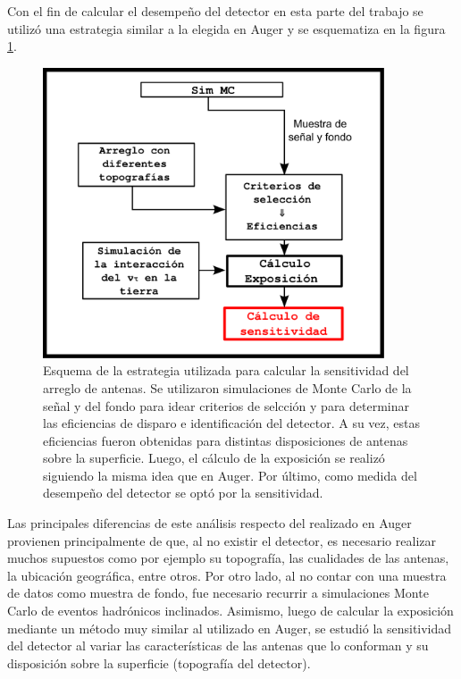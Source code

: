 Con el fin de calcular el desempe\~no del detector en esta parte del trabajo se utiliz\'o una estrategia similar a la elegida en Auger y se esquematiza en la figura \ref{fig:analysisSchemaRadio}.
%
\begin{figure}[h!]
	\begin{center}
		\includegraphics[width=0.9\textwidth]{fig/motivacionRadio/analysisSchemaRadio}
		\caption{Esquema de la estrategia utilizada para calcular la sensitividad del arreglo de antenas. Se utilizaron simulaciones de Monte Carlo de la se\~nal y del fondo para idear criterios de selcci\'on y para determinar las eficiencias de disparo e identificaci\'on del detector. A su vez, estas eficiencias fueron obtenidas para distintas disposiciones de antenas sobre la superficie. Luego, el c\'alculo de la exposici\'on se realiz\'o siguiendo la misma idea que en Auger. Por \'ultimo, como medida del desempe\~no del detector se opt\'o por la sensitividad.}
		\label{fig:analysisSchemaRadio}
	\end{center}
\end{figure}
%
Las principales diferencias de este an\'alisis respecto del realizado en Auger provienen principalmente de que, al no existir el detector, es necesario realizar muchos supuestos como por ejemplo su topograf\'ia, las cualidades de las antenas, la ubicaci\'on geogr\'afica, entre otros.
Por otro lado, al no contar con una muestra de datos como muestra de fondo, fue necesario recurrir a simulaciones Monte Carlo de eventos hadr\'onicos inclinados.
Asimismo, luego de calcular la exposici\'on mediante un m\'etodo muy similar al utilizado en Auger, se estudi\'o la sensitividad del detector al variar las caracter\'isticas de las antenas que lo conforman y su disposici\'on sobre la superficie (topograf\'ia del detector).

